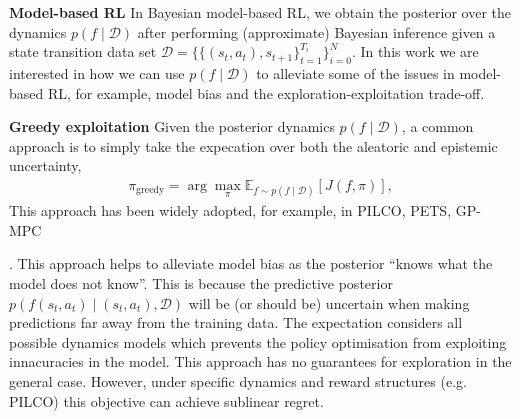 \documentclass{article}
\begin{document}
\textbf{Model-based RL}
In Bayesian model-based RL, we obtain the posterior over the dynamics \(p(f\mid\mathcal{D})\) after performing (approximate) Bayesian
inference given a state transition data set \(\mathcal{D} = \{\{(s_{t},a_{t}), s_{t+1}\}^{T_{i}}_{t=1}\}_{i=0}^{N}\).
In this work we are interested in how we can use \(p(f \mid \mathcal{D})\) to alleviate some of the issues in model-based RL,
for example, model bias and the exploration-exploitation trade-off.

\textbf{Greedy exploitation}
Given the posterior dynamics \(p(f \mid \mathcal{D})\),
a common approach is to simply take the expecation over both the aleatoric and epistemic uncertainty,
\begin{align} \label{eq-greedy}
\pi_{\text{greedy}} = \arg \max_{\pi} \mathbb{E}_{f \sim p(f \mid \mathcal{D})} \left[ J(f, \pi) \right],
\end{align}
This approach has been widely adopted, for example, in PILCO, PETS, GP-MPC

\cite{deisenrothPILCO2011,chuaDeepReinforcementLearning2018,kamtheDataEfficient2018}.
This approach helps to alleviate model bias as the posterior ``knows what the model does not know''.
This is because the predictive posterior \(p(f(s_{t},a_{t}) \mid (s_{t},a_{t}),  \mathcal{D} )\) will be (or should be) uncertain when making
predictions far away from the training data.
The expectation considers all possible dynamics models which prevents the policy optimisation from
exploiting innacuracies in the model.
This approach has no guarantees for exploration in the general case.
However, under specific dynamics and reward structures (e.g. PILCO) this objective can achieve sublinear regret.
\end{document}
